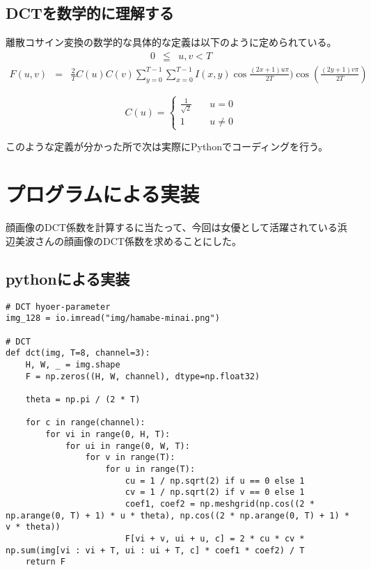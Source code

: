 \documentclass[dvipdfmx,uplatex]{jsarticle}
\begin{document}
\begin{spacing}{1.4}
\subsection{DCTを数学的に理解する}
離散コサイン変換の数学的な具体的な定義は以下のように定められている。\\
\begin{eqnarray*}
0 &\leqq& u, v < T
\end{eqnarray*}
\begin{eqnarray}
F(u, v) &=& \frac{2}{T}C(u)C(v)\sum_{y=0}^{T-1}\sum_{x=0}^{T-1}I(x, y)\cos\frac{(2x + 1)u\pi}{2T})\cos(\frac{(2y + 1)v\pi}{2T})
\end{eqnarray}

\[\displaystyle
C(u) =
\begin{cases}
\frac{1}{\sqrt{2}} & \quad u = 0 \\
1 & \quad u \neq 0
\end{cases}
\]

このような定義が分かった所で次は実際にPythonでコーディングを行う。

\newpage

\section{プログラムによる実装}
顔画像のDCT係数を計算するに当たって、今回は女優として活躍されている浜辺美波さんの顔画像のDCT係数を求めることにした。

\subsection{pythonによる実装}

\begin{lstlisting}[caption=DCT係数を求めるソースコード]
# DCT hyoer-parameter
img_128 = io.imread("img/hamabe-minai.png")

# DCT
def dct(img, T=8, channel=3):
    H, W, _ = img.shape
    F = np.zeros((H, W, channel), dtype=np.float32)

    theta = np.pi / (2 * T)

    for c in range(channel):
        for vi in range(0, H, T):
            for ui in range(0, W, T):
                for v in range(T):
                    for u in range(T):
                        cu = 1 / np.sqrt(2) if u == 0 else 1
                        cv = 1 / np.sqrt(2) if v == 0 else 1
                        coef1, coef2 = np.meshgrid(np.cos((2 * np.arange(0, T) + 1) * u * theta), np.cos((2 * np.arange(0, T) + 1) * v * theta))
                        F[vi + v, ui + u, c] = 2 * cu * cv * np.sum(img[vi : vi + T, ui : ui + T, c] * coef1 * coef2) / T
    return F


\end{lstlisting}
\end{spacing}
\end{document}
